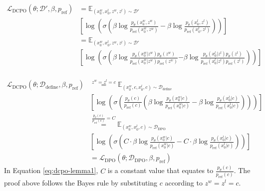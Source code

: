 \begin{equation}
    \begin{split}
        \mathcal{L}_{\text{DCPO}}(\theta;\mathcal{D'}, \beta, p_{\text{ref}}) & = \mathit{\mathbb{E}}_{(x^w_0, x^l_0, z^w, z^l) \sim \mathcal{D'}}
        \\ &
        \left[\log \left(\sigma \left(\beta \log \frac{p_\theta(x^w_0, z^w)}{p_{\text{ref}}(x^w_0, z^w)} - 
        \beta \log \frac{p_\theta(x^l_0, z^l)}{p_{\text{ref}}(x^l_0, z^l)} \right) \right)\right] \\
        & = \mathit{\mathbb{E}}_{(x^w_0, x^l_0, z^w, z^l) \sim \mathcal{D'}}
        \\ &
        \left[\log \left( \sigma \left(\beta \log 
        \frac{p_\theta (x^w_0|z^w) p_\theta(z^w)}{p_{\text{ref}}(x^w_0|z^w)p_{\text{ref}}(z^w)} \right. \right. \right.  \left. \left. \left. - \beta \log \frac{p_\theta(x^l_0|z^l) p_\theta(z^l)}{p_{\text{ref}}(x^l_0|z^l)p_{\text{ref}}(z^l)} \right) \right) \right] \\
    \end{split}
\end{equation}

\begin{equation}
\label{eq:dcpo-lemma1}
    \begin{split}
         \mathcal{L}_{\text{DCPO}}(\theta;\mathcal{D}_{\text{define}}, \beta, p_{\text{ref}}) & \stackrel{z^w=z^l=c}{=} 
         \mathit{\mathbb{E}}_{(x^w_0, c, x^l_0, c) \sim \mathcal{D}_\text{define}} 
         \\ &
         \left[ \log \left(\sigma \left(\frac{p_\theta(c)}{p_{\text{ref}}(c)} \left ( \beta \log \frac{p_\theta(x^w_0|c)}{p_{\text{ref}}(x^w_0|c)} - \beta \log \frac{p_\theta (x^l_0|c)}{p_\text{ref}(x^l_0|c)} \right) \right) \right) \right] \\
         & \stackrel{\frac{p_\theta(c)}{p_{\text{ref}}(c)}=C}{=} \mathit{\mathbb{E}}_{(x^w_0, x^l_0, c) \sim \mathcal{D}_\text{DPO}} 
         \\ &
         \left[ \log \left(\sigma \left(C \cdot \beta \log \frac{p_\theta(x^w_0|c)}{p_{\text{ref}}(x^w_0|c)} - C \cdot  \beta \log \frac{p_\theta (x^l_0|c)}{p_\text{ref}(x^l_0|c)} \right) \right) \right] \\
         & = \mathcal{L}_{\text{DPO}}(\theta; \mathcal{D}_\text{DPO}, \beta, p_{\text{ref}} )
    \end{split}
\end{equation}
In Equation \ref{eq:dcpo-lemma1}, $C$ is a constant value that equates 
 to $\frac{p_\theta(c)}{p_{\text{ref}}(c)}$. The proof above follows the Bayes rule by substituting $c$ according to $z^w=z^l=c$.


